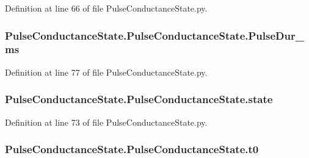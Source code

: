 Definition at line 66 of file Pulse\+Conductance\+State.\+py.

\subsubsection[{\texorpdfstring{Pulse\+Dur\+\_\+ms}{PulseDur_ms}}]{\setlength{\rightskip}{0pt plus 5cm}Pulse\+Conductance\+State.\+Pulse\+Conductance\+State.\+Pulse\+Dur\+\_\+ms}\hypertarget{class_pulse_conductance_state_1_1_pulse_conductance_state_afda03b180fc3cb619de615632e725a6f}{}\label{class_pulse_conductance_state_1_1_pulse_conductance_state_afda03b180fc3cb619de615632e725a6f}


Definition at line 77 of file Pulse\+Conductance\+State.\+py.

\subsubsection[{\texorpdfstring{state}{state}}]{\setlength{\rightskip}{0pt plus 5cm}Pulse\+Conductance\+State.\+Pulse\+Conductance\+State.\+state}\hypertarget{class_pulse_conductance_state_1_1_pulse_conductance_state_ac85aa714a187088e1b31fa2369ed4bca}{}\label{class_pulse_conductance_state_1_1_pulse_conductance_state_ac85aa714a187088e1b31fa2369ed4bca}


Definition at line 73 of file Pulse\+Conductance\+State.\+py.

\subsubsection[{\texorpdfstring{t0}{t0}}]{\setlength{\rightskip}{0pt plus 5cm}Pulse\+Conductance\+State.\+Pulse\+Conductance\+State.\+t0}\hypertarget{class_pulse_conductance_state_1_1_pulse_conductance_state_a55f44caf230fc3899811924118705f56}{}\label{class_pulse_conductance_state_1_1_pulse_conductance_state_a55f44caf230fc3899811924118705f56}


